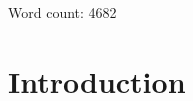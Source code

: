 \documentclass[
]{article}
\begin{document}
%

Word count: 4682

\hypertarget{introduction}{%
\section{Introduction}\label{introduction}}
\end{document}
